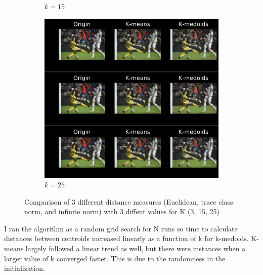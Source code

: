 \documentclass[a4paper]{article}
\begin{document}
\begin{figure}[h]
\begin{subfigure}[b]{0.3\textwidth}
        \caption{$k=15$}
        \label{fig:k_15}
    \end{subfigure}
    \begin{subfigure}[b]{0.3\textwidth}
        \includegraphics[width=\textwidth]{k_25.png}
        \caption{$k=25$}
        \label{fig:k_25}
    \end{subfigure}
    \caption{Comparison of 3 different distance measures (Euclidean, trace class norm, and infinite norm) with 3 diffent values for K (3, 15, 25)}\label{fig1}
\end{figure}

I ran the algorithm as a random grid search for N runs so time to calculate distances between centroids increased linearly as a function of k for k-medoids.  K-means largely
followed a linear trend as well, but there were instances when a larger value of k converged faster.  This is due to the randomness in the initialization. 
\end{document}
